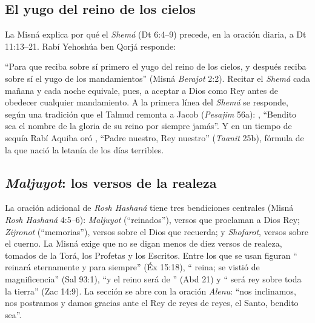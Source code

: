 
\subsection{El yugo del reino de los cielos}
La Misná explica por qué el \emph{Shemá} (Dt 6:4--9) precede, en la oración diaria, a Dt 11:13--21. Rabí Yehoshúa ben Qorjá responde:


``Para que reciba sobre sí primero el yugo del reino de los cielos, y después reciba sobre sí el yugo de los mandamientos'' (Misná \emph{Berajot} 2:2). Recitar el \emph{Shemá} cada mañana y cada noche equivale, pues, a aceptar a Dios como Rey antes de obedecer cualquier mandamiento. A la primera línea del \emph{Shemá} se responde, según una tradición que el Talmud remonta a Jacob (\emph{Pesajim} 56a): , ``Bendito sea el nombre de la gloria de su reino por siempre jamás''. Y en un tiempo de sequía Rabí Aquiba oró , ``Padre nuestro, Rey nuestro'' (\emph{Taanit} 25b), fórmula de la que nació la letanía de los días terribles.


\subsection{\emph{Maljuyot}: los versos de la realeza}
La oración adicional de \emph{Rosh Hashaná} tiene tres bendiciones centrales (Misná \emph{Rosh Hashaná} 4:5--6): \emph{Maljuyot} (``reinados''), versos que proclaman a Dios Rey; \emph{Zijronot} (``memorias''), versos sobre el Dios que recuerda; y \emph{Shofarot}, versos sobre el cuerno. La Misná exige que no se digan menos de diez versos de realeza, tomados de la Torá, los Profetas y los Escritos. Entre los que se usan figuran ``\SENOR{} reinará eternamente y para siempre'' (Éx 15:18), ``\SENOR{} reina; se vistió de magnificencia'' (Sal 93:1), ``y el reino será de \SENOR'' (Abd 21) y ``\SENOR{} será rey sobre toda la tierra'' (Zac 14:9). La sección se abre con la oración \emph{Alenu}: ``nos inclinamos, nos postramos y damos gracias ante el Rey de reyes de reyes, el Santo, bendito sea''.

